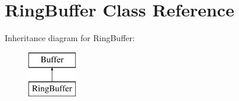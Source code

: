 \hypertarget{class_ring_buffer}{\section{Ring\+Buffer Class Reference}
\label{class_ring_buffer}
}
Inheritance diagram for Ring\+Buffer\+:\begin{figure}[H]
\begin{center}
\leavevmode
\includegraphics[height=2.000000cm]{class_ring_buffer}
\end{center}
\end{figure}

